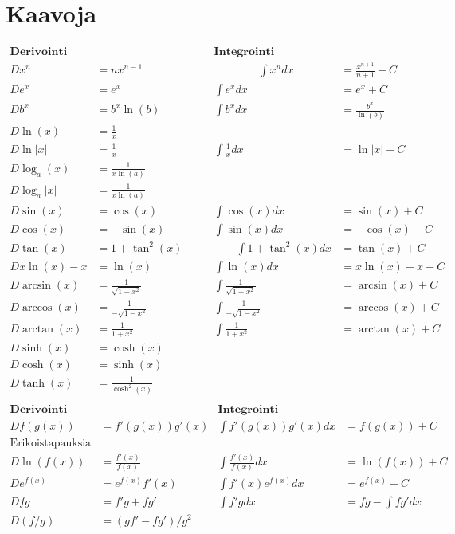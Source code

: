 \documentclass[12pt]{article}
\begin{document}
\section*{Kaavoja}

$$
\begin{array}{rl|rl}
\textbf{Derivointi} && \textbf{Integrointi}&\\[2mm]
Dx^n&=nx^{n-1}     \qquad\qquad&\qquad\qquad\int x^ndx&=\frac{x^{n+1}}{n+1}+C \\[2mm]
De^x&=e^x &\int e^xdx&=e^x+C\\[2mm]
Db^x&=b^x\ln(b) & \int b^xdx&=\frac{b^x}{\ln(b)}\\[2mm]
D\ln(x)&=\frac{1}{x} &&\\[2mm]
D\ln|x|&=\frac{1}{x} &\int\frac{1}{x}dx&=\ln|x|+C\\[2mm]
D\log_a(x)&=\frac{1}{x\ln(a)} &&\\[2mm]
D\log_a|x|&=\frac{1}{x\ln(a)} &&\\[2mm]
D\sin(x)&=\cos(x)   &\int\cos(x)dx&=\sin(x)+C\\[2mm]
D\cos(x)&=-\sin(x)  &\int\sin(x)dx&=-\cos(x)+C\\[2mm]
D\tan(x)&=1+\tan^2(x) \qquad&\qquad\int 1+\tan^2(x)dx&=\tan(x)+C\\[2mm]

Dx\ln(x)-x&=\ln(x) & \int\ln(x)dx&=x\ln(x)-x+C\\[10mm]

D\arcsin(x)&=\frac{1}{\sqrt{1-x^2}} & \int\frac{1}{\sqrt{1-x^2}}&=\arcsin(x)+C\\
D\arccos(x)&=\frac{1}{-\sqrt{1-x^2}} & \int\frac{1}{-\sqrt{1-x^2}}&=\arccos(x)+C\\
D\arctan(x)&=\frac{1}{1+x^2} & \int\frac{1}{1+x^2}&=\arctan(x)+C\\

D\sinh(x)&=\cosh(x) &&\\
D\cosh(x)&=\sinh(x) &&\\
D\tanh(x)&=\frac{1}{\cosh^2(x)} &&\\
\end{array}  
$$
\vspace{1cm}
$$
\begin{array}{rl|rl}
\textbf{Derivointi} && \textbf{Integrointi}&\\[2mm]
D f(g(x))&=f'(g(x))g'(x) & \int f'(g(x))g'(x)dx&=f(g(x))+C\\[2mm]
\textrm{Erikoistapauksia} &&&\\
D\ln(f(x))&=\frac{f'(x)}{f(x)} & \int \frac{f'(x)}{f(x)}dx&=\ln(f(x))+C\\[2mm]
D e^{f(x)}&=e^{f(x)}f'(x) & \int f'(x)e^{f(x)}dx&=e^{f(x)}+C\\[10mm]
D fg&=f'g+fg'& \int f'g dx&=fg-\int fg'dx\\[2mm]
D (f/g)&=(gf'-fg')/g^2 &&\\[2mm]
\end{array}  
$$
\end{document}
